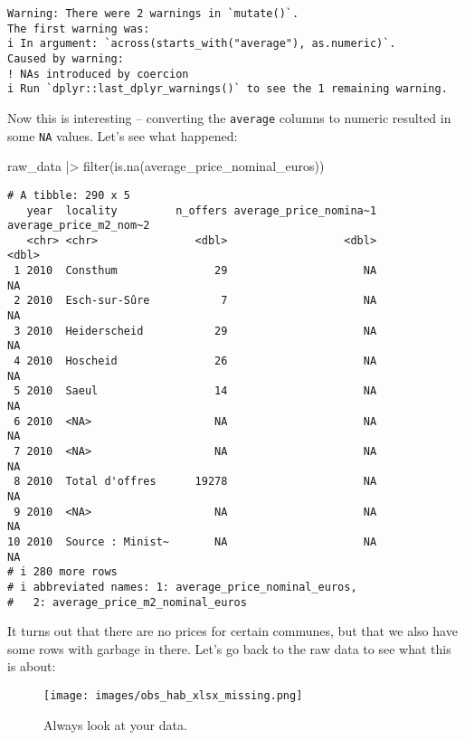 \documentclass[
  letterpaper,
  DIV=11,
  numbers=noendperiod]{scrartcl}
\newenvironment{Shaded}{\begin{snugshade}}{\end{snugshade}}
\newcommand{\FunctionTok}[1]{\textcolor[rgb]{0.28,0.35,0.67}{#1}}
\newcommand{\NormalTok}[1]{\textcolor[rgb]{0.00,0.23,0.31}{#1}}
\newcommand{\SpecialCharTok}[1]{\textcolor[rgb]{0.37,0.37,0.37}{#1}}
\begin{document}
\begin{verbatim}
Warning: There were 2 warnings in `mutate()`.
The first warning was:
i In argument: `across(starts_with("average"), as.numeric)`.
Caused by warning:
! NAs introduced by coercion
i Run `dplyr::last_dplyr_warnings()` to see the 1 remaining warning.
\end{verbatim}

Now this is interesting -- converting the \texttt{average} columns to
numeric resulted in some \texttt{NA} values. Let's see what happened:

\begin{Shaded}
\begin{Highlighting}[]
\NormalTok{raw\_data }\SpecialCharTok{|\textgreater{}}
  \FunctionTok{filter}\NormalTok{(}\FunctionTok{is.na}\NormalTok{(average\_price\_nominal\_euros))}
\end{Highlighting}
\end{Shaded}

\begin{verbatim}
# A tibble: 290 x 5
   year  locality         n_offers average_price_nomina~1 average_price_m2_nom~2
   <chr> <chr>               <dbl>                  <dbl>                  <dbl>
 1 2010  Consthum               29                     NA                     NA
 2 2010  Esch-sur-Sûre           7                     NA                     NA
 3 2010  Heiderscheid           29                     NA                     NA
 4 2010  Hoscheid               26                     NA                     NA
 5 2010  Saeul                  14                     NA                     NA
 6 2010  <NA>                   NA                     NA                     NA
 7 2010  <NA>                   NA                     NA                     NA
 8 2010  Total d'offres      19278                     NA                     NA
 9 2010  <NA>                   NA                     NA                     NA
10 2010  Source : Minist~       NA                     NA                     NA
# i 280 more rows
# i abbreviated names: 1: average_price_nominal_euros,
#   2: average_price_m2_nominal_euros
\end{verbatim}

It turns out that there are no prices for certain communes, but that we
also have some rows with garbage in there. Let's go back to the raw data
to see what this is about:

\begin{figure}

{\centering \texttt{[image: images/obs\_hab\_xlsx\_missing.png]}

}

\caption{Always look at your data.}

\end{figure}
\end{document}
